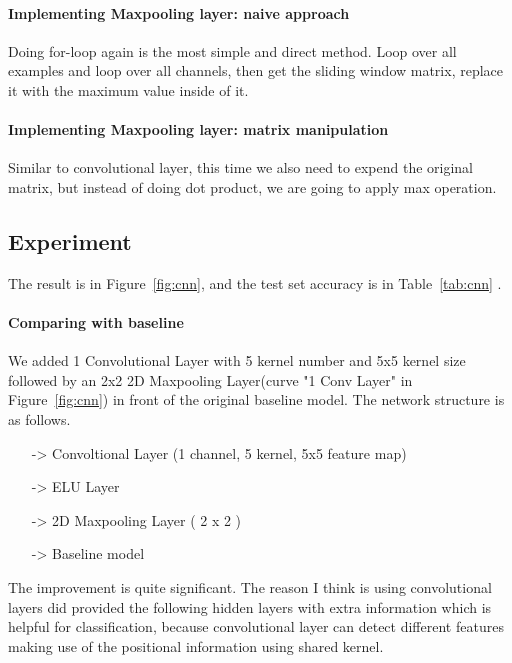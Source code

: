 \documentclass{article}
\begin{document}
\paragraph{Implementing Maxpooling layer: naive approach}
Doing for-loop again is the most simple and direct method. Loop over all examples and loop over all channels, then get the sliding window matrix, replace it with the maximum value inside of it.

\paragraph{Implementing Maxpooling layer: matrix manipulation}
Similar to convolutional layer, this time we also need to expend the original matrix, but instead of doing dot product, we are going to apply max operation.

\subsection{Experiment}
The result is in Figure~\ref{fig:cnn}, and the test set accuracy is in Table~\ref{tab:cnn} . 
\paragraph{Comparing with baseline} 
We added 1 Convolutional Layer with 5 kernel number and 5x5 kernel size followed by an 2x2 2D Maxpooling Layer(curve "1 Conv Layer" in Figure~\ref{fig:cnn}) in front of the original baseline model. The network structure is as follows.

\begin{itemize}
	\item[->] Convoltional Layer (1 channel, 5 kernel, 5x5 feature map)
	\item[->] ELU Layer
	\item[->] 2D Maxpooling Layer ( 2 x 2 )
	\item[->] Baseline model
\end{itemize}

The improvement is quite significant. The reason I think is using convolutional layers did provided the following hidden layers with extra information which is helpful for classification, because convolutional layer can detect different features making use of the positional information using shared kernel. 
\end{document}
